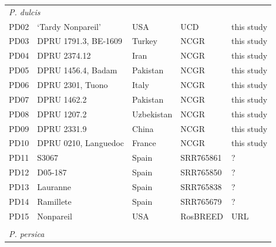 \documentclass[12pt]{article}
\begin{document}
\begin{center}
\begin{longtable}{lllll}
                 \multicolumn{5}{l}{\emph{P. dulcis}}  \\
                 PD02 &‘Tardy Nonpareil’ &USA &UCD &this study\\
                 PD03 &DPRU 1791.3, BE-1609 &Turkey &NCGR &this study\\
                 PD04 &DPRU 2374.12 &Iran &NCGR &this study\\
                 PD05 &DPRU 1456.4, Badam &Pakistan &NCGR &this study\\
                 PD06 &DPRU 2301, Tuono &Italy &NCGR &this study\\
                 PD07 &DPRU 1462.2 &Pakistan &NCGR &this study\\
                 PD08 &DPRU 1207.2 &Uzbekistan &NCGR &this study\\
                 PD09 &DPRU 2331.9 &China &NCGR &this study\\
                 PD10 &DPRU 0210, Languedoc &France &NCGR &this study\\ %
                 PD11 &S3067 &Spain &SRR765861 &\citealt{koepke2013comparative}?\\
                 PD12 &D05-187 &Spain &SRR765850 &\citealt{koepke2013comparative}?\\
                 PD13 &Lauranne &Spain &SRR765838 &\citealt{koepke2013comparative}?\\
                 PD14 &Ramillete &Spain &SRR765679 &\citealt{koepke2013comparative}?\\
                 PD15 &Nonpareil & USA&RosBREED &URL \\
                 \\
                 \multicolumn{5}{l}{\emph{P. persica}}  \\ %

\end{longtable}
\end{center}
\end{document}

